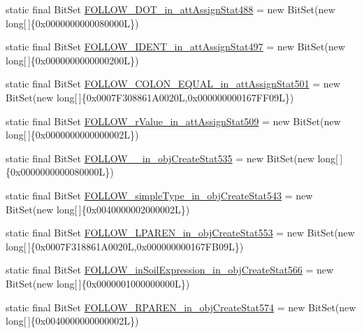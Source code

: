 \begin{DoxyCompactItemize}
static final Bit\-Set \hyperlink{classorg_1_1tzi_1_1use_1_1parser_1_1soil_1_1_soil_parser_a8a6eeecef2a90bd63d4dcf99ae5301e6}{F\-O\-L\-L\-O\-W\-\_\-\-D\-O\-T\-\_\-in\-\_\-att\-Assign\-Stat488} = new Bit\-Set(new long\mbox{[}$\,$\mbox{]}\{0x0000000000080000\-L\})
\item 
static final Bit\-Set \hyperlink{classorg_1_1tzi_1_1use_1_1parser_1_1soil_1_1_soil_parser_a7b7ba513658ccdf0ab2553f14718fb90}{F\-O\-L\-L\-O\-W\-\_\-\-I\-D\-E\-N\-T\-\_\-in\-\_\-att\-Assign\-Stat497} = new Bit\-Set(new long\mbox{[}$\,$\mbox{]}\{0x0000000000000200\-L\})
\item 
static final Bit\-Set \hyperlink{classorg_1_1tzi_1_1use_1_1parser_1_1soil_1_1_soil_parser_a203a00bd95211c8b2bd05e18e720d11d}{F\-O\-L\-L\-O\-W\-\_\-\-C\-O\-L\-O\-N\-\_\-\-E\-Q\-U\-A\-L\-\_\-in\-\_\-att\-Assign\-Stat501} = new Bit\-Set(new long\mbox{[}$\,$\mbox{]}\{0x0007\-F308861\-A0020\-L,0x000000000167\-F\-F09\-L\})
\item 
static final Bit\-Set \hyperlink{classorg_1_1tzi_1_1use_1_1parser_1_1soil_1_1_soil_parser_aa3e7aa65a53302c079c0b5c0900a2209}{F\-O\-L\-L\-O\-W\-\_\-r\-Value\-\_\-in\-\_\-att\-Assign\-Stat509} = new Bit\-Set(new long\mbox{[}$\,$\mbox{]}\{0x0000000000000002\-L\})
\item 
static final Bit\-Set \hyperlink{classorg_1_1tzi_1_1use_1_1parser_1_1soil_1_1_soil_parser_a011b44770bb4507d9ca5a06689a2ab3b}{F\-O\-L\-L\-O\-W\-\_\-\_\-in\-\_\-obj\-Create\-Stat535} = new Bit\-Set(new long\mbox{[}$\,$\mbox{]}\{0x0000000000080000\-L\})
\item 
static final Bit\-Set \hyperlink{classorg_1_1tzi_1_1use_1_1parser_1_1soil_1_1_soil_parser_a793fb13ca352004b514c5fa31932da61}{F\-O\-L\-L\-O\-W\-\_\-simple\-Type\-\_\-in\-\_\-obj\-Create\-Stat543} = new Bit\-Set(new long\mbox{[}$\,$\mbox{]}\{0x0040000002000002\-L\})
\item 
static final Bit\-Set \hyperlink{classorg_1_1tzi_1_1use_1_1parser_1_1soil_1_1_soil_parser_af38f8962a7d71582428685e0d25ccb43}{F\-O\-L\-L\-O\-W\-\_\-\-L\-P\-A\-R\-E\-N\-\_\-in\-\_\-obj\-Create\-Stat553} = new Bit\-Set(new long\mbox{[}$\,$\mbox{]}\{0x0007\-F318861\-A0020\-L,0x000000000167\-F\-B09\-L\})
\item 
static final Bit\-Set \hyperlink{classorg_1_1tzi_1_1use_1_1parser_1_1soil_1_1_soil_parser_ab26437604bb2850cab5b71968d6b08e7}{F\-O\-L\-L\-O\-W\-\_\-in\-Soil\-Expression\-\_\-in\-\_\-obj\-Create\-Stat566} = new Bit\-Set(new long\mbox{[}$\,$\mbox{]}\{0x0000001000000000\-L\})
\item 
static final Bit\-Set \hyperlink{classorg_1_1tzi_1_1use_1_1parser_1_1soil_1_1_soil_parser_a745fe14c7a9c8714faf045c4fb464302}{F\-O\-L\-L\-O\-W\-\_\-\-R\-P\-A\-R\-E\-N\-\_\-in\-\_\-obj\-Create\-Stat574} = new Bit\-Set(new long\mbox{[}$\,$\mbox{]}\{0x0040000000000002\-L\})

\end{DoxyCompactItemize}
